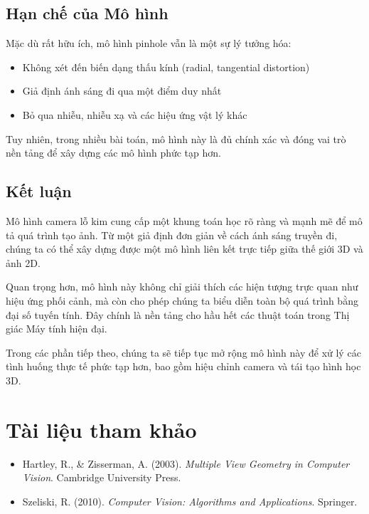 \subsection{Hạn chế của Mô hình}
\label{subsec:pinhole_limitations}

Mặc dù rất hữu ích, mô hình pinhole vẫn là một sự lý tưởng hóa:

\begin{itemize}
	\item Không xét đến biến dạng thấu kính (radial, tangential distortion)
	\item Giả định ánh sáng đi qua một điểm duy nhất
	\item Bỏ qua nhiễu, nhiễu xạ và các hiệu ứng vật lý khác
\end{itemize}

Tuy nhiên, trong nhiều bài toán, mô hình này là đủ chính xác và đóng vai trò nền tảng để xây dựng các mô hình phức tạp hơn.

\subsection{Kết luận}
\label{subsec:pinhole_conclusion}

Mô hình camera lỗ kim cung cấp một khung toán học rõ ràng và mạnh mẽ để mô tả quá trình tạo ảnh. Từ một giả định đơn giản về cách ánh sáng truyền đi, chúng ta có thể xây dựng được một mô hình liên kết trực tiếp giữa thế giới 3D và ảnh 2D.

Quan trọng hơn, mô hình này không chỉ giải thích các hiện tượng trực quan như hiệu ứng phối cảnh, mà còn cho phép chúng ta biểu diễn toàn bộ quá trình bằng đại số tuyến tính. Đây chính là nền tảng cho hầu hết các thuật toán trong Thị giác Máy tính hiện đại.

Trong các phần tiếp theo, chúng ta sẽ tiếp tục mở rộng mô hình này để xử lý các tình huống thực tế phức tạp hơn, bao gồm hiệu chỉnh camera và tái tạo hình học 3D.

\section*{Tài liệu tham khảo}
\begin{itemize}
	\item[1] Hartley, R., \& Zisserman, A. (2003). \textit{Multiple View Geometry in Computer Vision}. Cambridge University Press.
	\item[2] Szeliski, R. (2010). \textit{Computer Vision: Algorithms and Applications}. Springer.
\end{itemize}